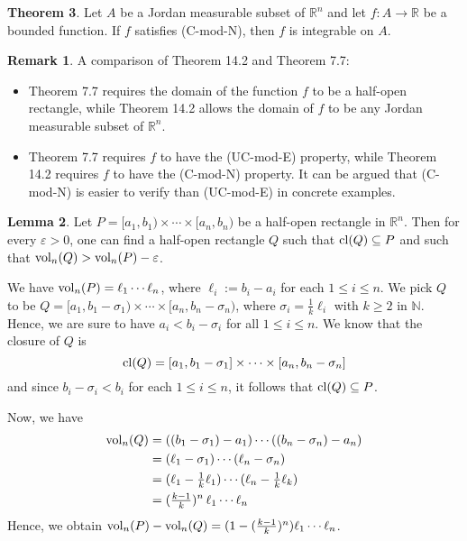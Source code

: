 \documentclass[11pt]{article}
\makeatletter
\theoremstyle{definition}
\newtheorem{thm}{Theorem}[section]
\newtheorem{lemma}[thm]{Lemma}
\newtheorem{remark}[thm]{Remark}
\newcommand{\N}{\ensuremath{\mathbb{N}}}
\newcommand{\R}{\ensuremath{\mathbb{R}}}
\newenvironment{pf}[1][\proofname]{\par
  \pushQED{\qed}%
  \normalfont \topsep0\p@\relax
  \trivlist
  \item[\hskip\labelsep\itshape
  #1\@addpunct{.}]\ignorespaces
}{%
  \popQED\endtrivlist\@endpefalse
}
\makeatother
\begin{document}
\begin{thm}
Let $A$ be a Jordan measurable subset of $\R^n$ and let $f : A \to \R$ be a bounded function. If $f$ satisfies (C-mod-N), then $f$ is integrable on $A$.

\begin{remark}
A comparison of Theorem 14.2 and Theorem 7.7:\vspace{-1.5ex}
\begin{itemize}
    \item Theorem 7.7 requires the domain of the function $f$ to be a half-open rectangle, while Theorem 14.2 allows the domain of $f$ to be any Jordan measurable subset of $\R^n$.
    \item Theorem 7.7 requires $f$ to have the (UC-mod-E) property, while Theorem 14.2 requires $f$ to have the (C-mod-N) property. It can be argued that (C-mod-N) is easier to verify than (UC-mod-E) in concrete examples. 
\end{itemize}
\end{remark}

\begin{lemma}
Let $P = [a_1, b_1) \times \cdots \times [a_n, b_n)$ be a half-open rectangle in $\R^n$. Then for every $\varepsilon > 0$, one can find a half-open rectangle $Q$ such that ${\rm cl}(Q) \subseteq P$ and such that ${\rm vol}_n(Q) > {\rm vol}_n(P) - \varepsilon$.
\begin{pf}
We have ${\rm vol}_n(P) = \ell_1 \cdots \ell_n$, where $\ell_i := b_i - a_i$ for each $1 \leq i \leq n$. We pick $Q$ to be $Q = [a_1, b_1 - \sigma_1) \times \cdots \times [a_n, b_n - \sigma_n)$, where $\sigma_i = \frac1k \ell_i$ with $k \geq 2$ in $\N$. Hence, we are sure to have $a_i < b_i - \sigma_i$ for all $1 \leq i \leq n$. We know that the closure of $Q$ is
$${\rm cl}(Q) = [a_1, b_1 - \sigma_1] \times \cdots \times [a_n, b_n - \sigma_n]$$
and since $b_i - \sigma_i < b_i$ for each $1 \leq i \leq n$, it follows that ${\rm cl}(Q) \subseteq P$. 

Now, we have
\begin{align*}
    {\rm vol}_n(Q) &= ((b_1 - \sigma_1) - a_1) \cdots ((b_n - \sigma_n) - a_n) \\
    &= (\ell_1 - \sigma_1) \cdots (\ell_n - \sigma_n) \\
    &= (\ell_1 - \tfrac1k\ell_1) \cdots (\ell_n - \tfrac1k\ell_k) \\
    &= (\tfrac{k-1}k)^n\, \ell_1 \cdots \ell_n
\end{align*}
Hence, we obtain ${\rm vol}_n(P) - {\rm vol}_n(Q) = (1 - (\frac{k-1}k)^n) \ell_1 \cdots \ell_n$.


\end{pf}
\end{lemma}
\end{thm}
\end{document}
